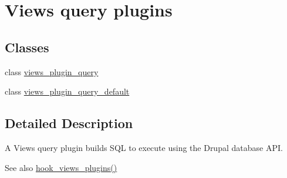 \hypertarget{group__views__query__plugins}{
\section{Views query plugins}
\label{group__views__query__plugins}
}
\subsection*{Classes}
\begin{DoxyCompactItemize}
\item 
class \hyperlink{classviews__plugin__query}{views\_\-plugin\_\-query}
\item 
class \hyperlink{classviews__plugin__query__default}{views\_\-plugin\_\-query\_\-default}
\end{DoxyCompactItemize}


\subsection{Detailed Description}
A Views query plugin builds SQL to execute using the Drupal database API.

\begin{DoxySeeAlso}{See also}
\hyperlink{group__views__hooks_ga23f6e9972b2ed84fc54b7ff63f44477d}{hook\_\-views\_\-plugins()} 
\end{DoxySeeAlso}
